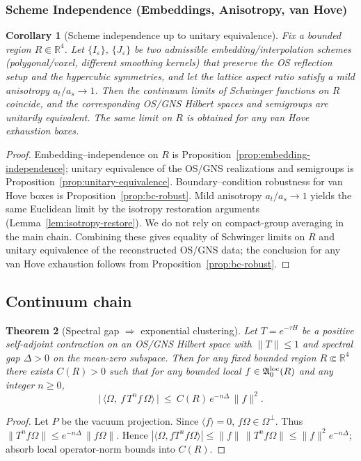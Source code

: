 \documentclass[11pt]{amsart}
\theoremstyle{plain}
\newtheorem{theorem}{Theorem}[section]
\newtheorem{corollary}[theorem]{Corollary}
\theoremstyle{definition}
\theoremstyle{remark}
\begin{document}
\subsubsection*{Scheme Independence (Embeddings, Anisotropy, van Hove)}
\begin{corollary}[Scheme independence up to unitary equivalence]\label{cor:scheme-independence}
Fix a bounded region $R\Subset\mathbb R^4$. Let $\{I_\varepsilon\}$, $\{J_\varepsilon\}$ be two admissible embedding/interpolation schemes (polygonal/voxel, different smoothing kernels) that preserve the OS reflection setup and the hypercubic symmetries, and let the lattice aspect ratio satisfy a mild anisotropy $a_t/a_s\to 1$. Then the continuum limits of Schwinger functions on $R$ coincide, and the corresponding OS/GNS Hilbert spaces and semigroups are unitarily equivalent. The same limit on $R$ is obtained for any van Hove exhaustion boxes.
\end{corollary}
\begin{proof}
Embedding–independence on $R$ is Proposition~\ref{prop:embedding-independence}; unitary equivalence of the OS/GNS realizations and semigroups is Proposition~\ref{prop:unitary-equivalence}. Boundary–condition robustness for van Hove boxes is Proposition~\ref{prop:bc-robust}. Mild anisotropy $a_t/a_s\to 1$ yields the same Euclidean limit by the isotropy restoration arguments (Lemma~\ref{lem:isotropy-restore}). We do not rely on compact-group averaging in the main chain. Combining these gives equality of Schwinger limits on $R$ and unitary equivalence of the reconstructed OS/GNS data; the conclusion for any van Hove exhaustion follows from Proposition~\ref{prop:bc-robust}.
\end{proof}

\subsection*{Continuum chain}

\begin{theorem}[Spectral gap $\Rightarrow$ exponential clustering]\label{thm:gap-to-clustering}
Let $T=e^{-\tau H}$ be a positive self-adjoint contraction on an OS/GNS Hilbert space with $\|T\|\le 1$ and spectral gap $\Delta>0$ on the mean-zero subspace. Then for any fixed bounded region $R\Subset\mathbb R^4$ there exists $C(R)>0$ such that for any bounded local $f\in\mathfrak A_0^{\rm loc}(R)$ and any integer $n\ge 0$,
\[
  \big|\,\langle \Omega,\ f\, T^n f\, \Omega\rangle\,\big|\ \le\ C(R)\, e^{-n\Delta}\,\|f\|^2.
\]
\end{theorem}
\begin{proof}
Let $P$ be the vacuum projection. Since $\langle f\rangle=0$, $f\Omega\in \Omega^\perp$. Thus $\|T^n f\Omega\|\le e^{-n\Delta}\,\|f\Omega\|$. Hence $|\langle \Omega, f T^n f \Omega\rangle|\le \|f\|\,\|T^n f\Omega\|\le \|f\|^2 e^{-n\Delta}$; absorb local operator-norm bounds into $C(R)$.
\end{proof}
\end{document}
